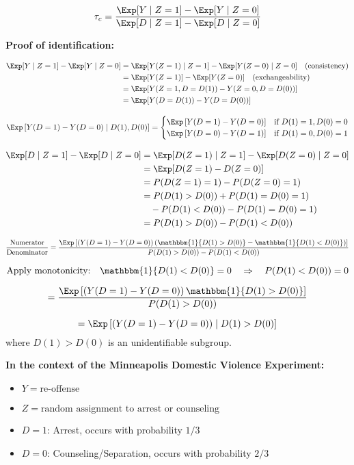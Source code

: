 \[
\tau_c = \frac{\Exp[Y \mid Z = 1] - \Exp[Y \mid Z = 0]}{\Exp[D \mid Z = 1] - \Exp[D \mid Z = 0]}
\]

\textbf{Proof of identification:}

\begin{align*}
\Exp[Y \mid Z = 1] - \Exp[Y \mid Z = 0] &= \Exp[Y(Z = 1) \mid Z = 1] - \Exp[Y(Z = 0) \mid Z = 0] \quad \text{(consistency)} \\
&= \Exp[Y(Z = 1)] - \Exp[Y(Z = 0)] \quad \text{(exchangeability)} \\
&= \Exp[Y(Z = 1, D = D(1)) - Y(Z = 0, D = D(0))] \\
&= \Exp[Y(D = D(1)) - Y(D = D(0))]
\end{align*}

\[
\Exp\left[ Y(D = 1) - Y(D = 0) \mid D(1), D(0) \right] =
\begin{cases}
    \Exp\left[ Y(D = 1) - Y(D = 0) \right] & \text{if } D(1) = 1, D(0) = 0 \\
    \Exp\left[ Y(D = 0) - Y(D = 1) \right] & \text{if } D(1) = 0, D(0) = 1
\end{cases}
\]

\begin{align*}
\Exp[D \mid Z = 1] - \Exp[D \mid Z = 0] &= \Exp[D(Z = 1) \mid Z = 1] - \Exp[D(Z = 0) \mid Z = 0] \\
&= \Exp[D(Z = 1) - D(Z = 0)] \\
&= P(D(Z = 1) = 1) - P(D(Z = 0) = 1) \\
&= P(D(1) > D(0)) + P(D(1) = D(0) = 1) \\
&\quad - P(D(1) < D(0)) - P(D(1) = D(0) = 1) \\
&= P(D(1) > D(0)) - P(D(1) < D(0))
\end{align*}

\[
\frac{\text{Numerator}}{\text{Denominator}} 
= \frac{\Exp\left[ (Y(D = 1) - Y(D = 0)) \left( \mathbbm{1}\{D(1) > D(0)\} - \mathbbm{1}\{D(1) < D(0)\} \right) \right]}{P(D(1) > D(0)) - P(D(1) < D(0))}
\]

\[
\text{Apply monotonicity:} \quad \mathbbm{1}\{D(1) < D(0)\} = 0 \quad \Rightarrow \quad P(D(1) < D(0)) = 0
\]


\[
= \frac{\Exp\left[ (Y(D = 1) - Y(D = 0)) \, \mathbbm{1}\{D(1) > D(0)\} \right]}{P(D(1) > D(0))}
\]

\[
= \Exp\left[ (Y(D = 1) - Y(D = 0)) \mid D(1) > D(0) \right]
\]
where \(D(1) > D(0)\) is an unidentifiable subgroup.

\bigskip

\textbf{In the context of the Minneapolis Domestic Violence Experiment:}
\begin{itemize}
    \item \(Y = \text{re-offense}\)
    \item \(Z = \text{random assignment to arrest or counseling}\)
    \item \(D = 1\): Arrest, occurs with probability \(1/3\)
    \item \(D = 0\): Counseling/Separation, occurs with probability \(2/3\)
\end{itemize}

